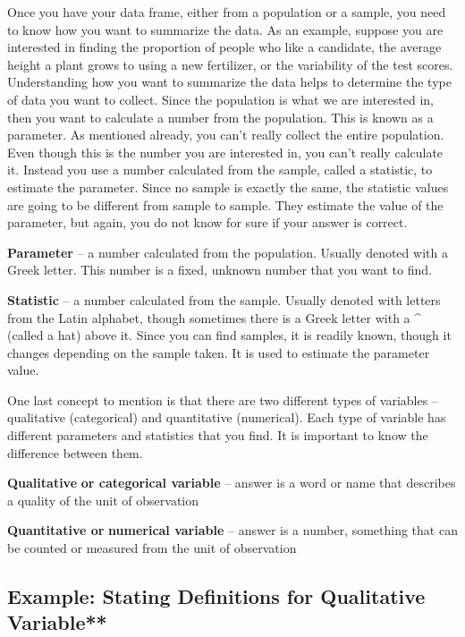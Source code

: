 \documentclass[
]{book}
\begin{document}
Once you have your data frame, either from a population or a sample, you need to know how you want to summarize the data. As an example, suppose you are interested in finding the proportion of people who like a candidate, the average height a plant grows to using a new fertilizer, or the variability of the test scores. Understanding how you want to summarize the data helps to determine the type of data you want to collect. Since the population is what we are interested in, then you want to calculate a number from the population. This is known as a parameter. As mentioned already, you can't really collect the entire population. Even though this is the number you are interested in, you can't really calculate it. Instead you use a number calculated from the sample, called a statistic, to estimate the parameter. Since no sample is exactly the same, the statistic values are going to be different from sample to sample. They estimate the value of the parameter, but again, you do not know for sure if your answer is correct.

\textbf{Parameter} -- a number calculated from the population. Usually denoted with a Greek letter. This number is a fixed, unknown number that you want to find.

\textbf{Statistic} -- a number calculated from the sample. Usually denoted with letters from the Latin alphabet, though sometimes there is a Greek letter with a \^{} (called a hat) above it. Since you can find samples, it is readily known, though it changes depending on the sample taken. It is used to estimate the parameter value.

One last concept to mention is that there are two different types of variables -- qualitative (categorical) and quantitative (numerical). Each type of variable has different parameters and statistics that you find. It is important to know the difference between them.

\textbf{Qualitative} \textbf{or categorical variable} -- answer is a word or name that describes a quality of the unit of observation

\textbf{Quantitative or} \textbf{numerical variable} -- answer is a number, something that can be counted or measured from the unit of observation

\hypertarget{example-stating-definitions-for-qualitative-variable}{%
\subsection{Example: Stating Definitions for Qualitative Variable**}\label{example-stating-definitions-for-qualitative-variable}}
\end{document}
